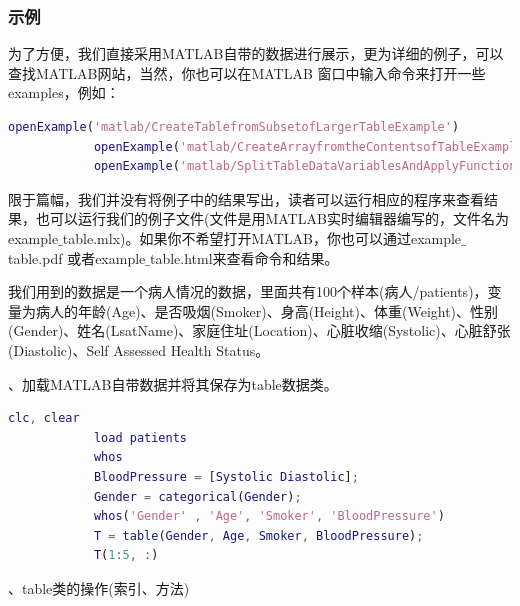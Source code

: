         \subsubsection{示例}
            \par
            为了方便，我们直接采用MATLAB自带的数据进行展示，更为详细的例子，可以查找MATLAB网站，当然，你也可以在MATLAB 窗口中输入命令来打开一些examples，例如：
            \begin{lstlisting}[language = Matlab]
            openExample('matlab/CreateTablefromSubsetofLargerTableExample')
            openExample('matlab/CreateArrayfromtheContentsofTableExample')
            openExample('matlab/SplitTableDataVariablesAndApplyFunctionsExample')
            \end{lstlisting}
            \par
            限于篇幅，我们并没有将例子中的结果写出，读者可以运行相应的程序来查看结果，也可以运行我们的例子文件(文件是用MATLAB实时编辑器编写的，文件名为example${\_}$table.mlx)。如果你不希望打开MATLAB，你也可以通过example${\_}$table.pdf 或者example${\_}$table.html来查看命令和结果。
            \par
            我们用到的数据是一个病人情况的数据，里面共有100个样本(病人/patients)，变量为病人的年龄(Age)、是否吸烟(Smoker)、身高(Height)、体重(Weight)、性别(Gender)、姓名(LsatName)、家庭住址(Location)、心脏收缩(Systolic)、心脏舒张(Diastolic)、Self Assessed Health Status。
            \par
            、加载MATLAB自带数据并将其保存为table数据类。
            \begin{lstlisting}[language=Matlab]
            clc, clear
            load patients
            whos
            BloodPressure = [Systolic Diastolic];
            Gender = categorical(Gender);
            whos('Gender' , 'Age', 'Smoker', 'BloodPressure')
            T = table(Gender, Age, Smoker, BloodPressure);
            T(1:5, :)
            \end{lstlisting}
            、table类的操作(索引、方法)
